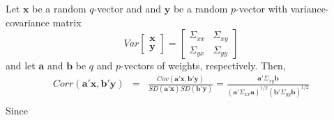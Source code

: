 \documentclass[12pt]{article}
\theoremstyle{definition}
\begin{document}
Let $\mathbf{x}$ be a random $q$-vector and and $\mathbf{y}$ be a random $p$-vector with variance-covariance matrix
  $$Var\left[\begin{array}
    {c} \textbf{x} \\ \textbf{y}
  \end{array}\right] = \left[ \begin{array}
    {cc} \Sigma_{xx} & \Sigma_{xy}\\
    \Sigma_{yx} & \Sigma_{yy}
  \end{array}\right]$$
and let $\mathbf{a}$ and $\mathbf{b}$ be $q$ and $p$-vectors of weights, respectively. Then,
\begin{eqnarray*}
  Corr(\textbf{a}'\textbf{x}, \textbf{b}'\textbf{y}) &=& \frac{Cov(\textbf{a}'\textbf{x}, \textbf{b}'\textbf{y})}{SD(\textbf{a}'\textbf{x})SD(\textbf{b}'\textbf{y})} = \frac{\mathbf{a}'\Sigma_{xy}\mathbf{b}}{\left(\mathbf{a}'\Sigma_{xx}\mathbf{a} \right)^{1/2}\left(\mathbf{b}'\Sigma_{yy}\mathbf{b} \right)^{1/2}}\\
\end{eqnarray*}
Since
\end{document}
